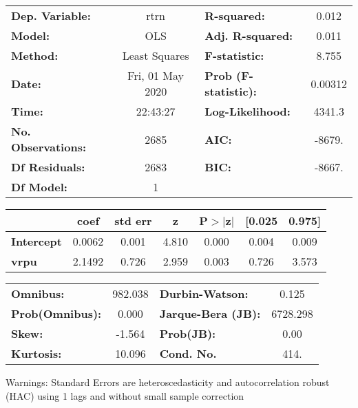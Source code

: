 \begin{center}
\begin{tabular}{lclc}
\toprule
\textbf{Dep. Variable:}    &       rtrn       & \textbf{  R-squared:         } &     0.012   \\
\textbf{Model:}            &       OLS        & \textbf{  Adj. R-squared:    } &     0.011   \\
\textbf{Method:}           &  Least Squares   & \textbf{  F-statistic:       } &     8.755   \\
\textbf{Date:}             & Fri, 01 May 2020 & \textbf{  Prob (F-statistic):} &  0.00312    \\
\textbf{Time:}             &     22:43:27     & \textbf{  Log-Likelihood:    } &    4341.3   \\
\textbf{No. Observations:} &        2685      & \textbf{  AIC:               } &    -8679.   \\
\textbf{Df Residuals:}     &        2683      & \textbf{  BIC:               } &    -8667.   \\
\textbf{Df Model:}         &           1      & \textbf{                     } &             \\
\bottomrule
\end{tabular}
\begin{tabular}{lcccccc}
                   & \textbf{coef} & \textbf{std err} & \textbf{z} & \textbf{P$> |$z$|$} & \textbf{[0.025} & \textbf{0.975]}  \\
\midrule
\textbf{Intercept} &       0.0062  &        0.001     &     4.810  &         0.000        &        0.004    &        0.009     \\
\textbf{vrpu}      &       2.1492  &        0.726     &     2.959  &         0.003        &        0.726    &        3.573     \\
\bottomrule
\end{tabular}
\begin{tabular}{lclc}
\textbf{Omnibus:}       & 982.038 & \textbf{  Durbin-Watson:     } &    0.125  \\
\textbf{Prob(Omnibus):} &   0.000 & \textbf{  Jarque-Bera (JB):  } & 6728.298  \\
\textbf{Skew:}          &  -1.564 & \textbf{  Prob(JB):          } &     0.00  \\
\textbf{Kurtosis:}      &  10.096 & \textbf{  Cond. No.          } &     414.  \\
\bottomrule
\end{tabular}
\end{center}

Warnings: \newline
 [1] Standard Errors are heteroscedasticity and autocorrelation robust (HAC) using 1 lags and without small sample correction